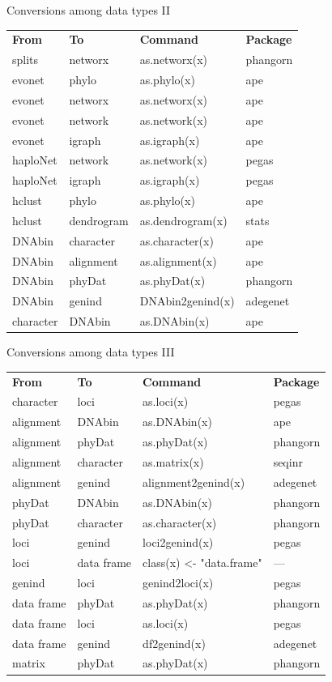 \documentclass[compress, ucs, xelatex, 11pt, xcolor=svgnames,
  hyperref={
    bookmarks=true,
    unicode=true,
    colorlinks=true,
    pdftitle={Molecular data in R},
    plainpages=false,
    pdfauthor={Vojtech Zeisek},
    pdfsubject={Course about phylogeny and evolution in R},
    pdfcreator={XeLaTeX},
    pdfkeywords={R, evolution, phylogeny, molecular data},
    linkcolor=Tomato,
    anchorcolor=SaddleBrown,
    citecolor=Goldenrod,
    filecolor=DarkMagenta,
    menucolor=Sienna,
    urlcolor=DarkTurquoise,
    pdftex},
  url={hyphens, lowtilde} %
  ]{beamer}
\begin{document}
\begin{frame}{Conversions among data types II}
  \begin{tabular}{llll}
    \textbf{From} & \textbf{To} & \textbf{Command} & \textbf{Package}\\
    splits & networx & as.networx(x) & phangorn\\
    evonet & phylo & as.phylo(x) & ape\\
    evonet & networx & as.networx(x) & ape\\
    evonet & network & as.network(x) & ape\\
    evonet & igraph & as.igraph(x) & ape\\
    haploNet & network & as.network(x) & pegas\\
    haploNet & igraph & as.igraph(x) & pegas\\
    hclust & phylo & as.phylo(x) & ape\\
    hclust & dendrogram & as.dendrogram(x) & stats\\
    DNAbin & character & as.character(x) & ape\\
    DNAbin & alignment & as.alignment(x) & ape\\
    DNAbin & phyDat & as.phyDat(x) & phangorn\\
    DNAbin & genind & DNAbin2genind(x) & adegenet\\
    character & DNAbin & as.DNAbin(x) & ape
  \end{tabular}
\end{frame}

\begin{frame}{Conversions among data types III}
  \begin{tabular}{llll}
    \textbf{From} & \textbf{To} & \textbf{Command} & \textbf{Package}\\
    character & loci & as.loci(x) & pegas\\
    alignment & DNAbin & as.DNAbin(x) & ape\\
    alignment & phyDat & as.phyDat(x) & phangorn\\
    alignment & character & as.matrix(x) & seqinr\\
    alignment & genind & alignment2genind(x) & adegenet\\
    phyDat & DNAbin & as.DNAbin(x) & phangorn\\
    phyDat & character & as.character(x) & phangorn\\
    loci & genind & loci2genind(x) & pegas\\
    loci & data frame & class(x) <- "data.frame" & --- \\
    genind & loci & genind2loci(x) & pegas\\
    data frame & phyDat & as.phyDat(x) & phangorn\\
    data frame & loci & as.loci(x) & pegas\\
    data frame & genind & df2genind(x) & adegenet\\
    matrix & phyDat & as.phyDat(x) & phangorn
  \end{tabular}
\end{frame}
\end{document}
